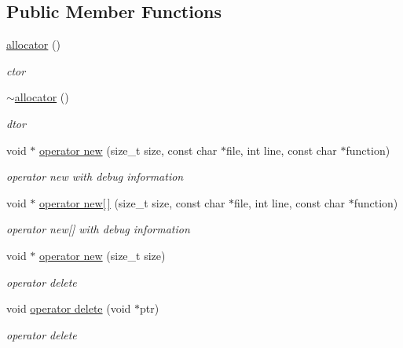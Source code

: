 \subsection*{Public Member Functions}
\begin{DoxyCompactItemize}
\item 
\mbox{\label{classminerva_1_1foundation_1_1allocator_a1d984a6c7360cac43c6182fc8c27f263}} 
\hyperlink{classminerva_1_1foundation_1_1allocator_a1d984a6c7360cac43c6182fc8c27f263}{allocator} ()
\begin{DoxyCompactList}\small\item\em ctor \end{DoxyCompactList}\item 
\mbox{\label{classminerva_1_1foundation_1_1allocator_a1818227b868a680283eb08fbaf2abec9}} 
\hyperlink{classminerva_1_1foundation_1_1allocator_a1818227b868a680283eb08fbaf2abec9}{$\sim$allocator} ()
\begin{DoxyCompactList}\small\item\em dtor \end{DoxyCompactList}\item 
void $\ast$ \hyperlink{classminerva_1_1foundation_1_1allocator_af693b0cd3bdec3bfdc4885b15f9d04c6}{operator new} (size\+\_\+t size, const char $\ast$file, int line, const char $\ast$function)
\begin{DoxyCompactList}\small\item\em operator new with debug information \end{DoxyCompactList}\item 
void $\ast$ \hyperlink{classminerva_1_1foundation_1_1allocator_a19f76fd74546cc86283694836b55570b}{operator new\mbox{[}$\,$\mbox{]}} (size\+\_\+t size, const char $\ast$file, int line, const char $\ast$function)
\begin{DoxyCompactList}\small\item\em operator new\mbox{[}\mbox{]} with debug information \end{DoxyCompactList}\item 
void $\ast$ \hyperlink{classminerva_1_1foundation_1_1allocator_abcd9786a851f3e12030c6dc5dffd1005}{operator new} (size\+\_\+t size)
\begin{DoxyCompactList}\small\item\em operator delete \end{DoxyCompactList}\item 
void \hyperlink{classminerva_1_1foundation_1_1allocator_ae33b6c28ecbd236c7e974ac9270601a8}{operator delete} (void $\ast$ptr)
\begin{DoxyCompactList}\small\item\em operator delete \end{DoxyCompactList}\end{DoxyCompactItemize}


